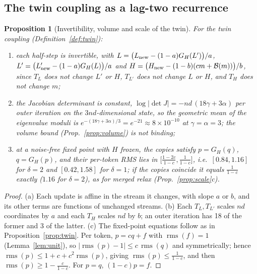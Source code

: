 \documentclass[11pt]{article}
\newtheorem{proposition}{Proposition}
\theoremstyle{definition}
\newcommand{\rms}{\operatorname{rms}}
\newcommand{\Bk}{\mathcal{B}}
\begin{document}
\subsection{The twin coupling as a lag-two recurrence}\label{sec:twintheory}

\begin{proposition}[Invertibility, volume and scale of the twin]\label{prop:twinprops}
For the twin coupling (Definition~\ref{def:twin}):
\begin{enumerate}[label=(\alph*),itemsep=0pt]
\item each half-step is invertible, with $L=\bigl(L_{\rm new}-(1-a)G_H(L')\bigr)/a$, $L'=\bigl(L'_{\rm new}-(1-a)G_H(L)\bigr)/a$ and
$H=\bigl(H_{\rm new}-(1-b)(cm+\Bk(m))\bigr)/b$, since $T_L$ does not change $L'$ or $H$, $T_{L'}$ does not change $L$ or $H$, and $T_H$ does not change $m$;
\item the Jacobian determinant is constant, $\log|\det J|=-nd\,(18\gamma+3\alpha)$ per outer iteration on the $3nd$-dimensional state, so the
geometric mean of the eigenvalue moduli is $e^{-(18\gamma+3\alpha)/3}=e^{-21}\approx8\times10^{-10}$ at $\gamma=\alpha=3$; the volume bound
(Prop.~\ref{prop:volume}) is not binding;
\item at a noise-free fixed point with $H$ frozen, the copies satisfy $p=G_H(q)$, $q=G_H(p)$, and their per-token RMS lies in
$\bigl[\tfrac{1-2c}{1-c},\tfrac1{1-c}\bigr]$, i.e.\ $[0.84,1.16]$ for $\delta=2$ and $[0.42,1.58]$ for $\delta=1$; if the copies coincide it equals
$\tfrac{1}{1-c}$ exactly ($1.16$ for $\delta=2$), as for merged relax (Prop.~\ref{prop:scale}c).
\end{enumerate}
\end{proposition}
\begin{proof}(a) Each update is affine in the stream it changes, with slope $a$ or $b$, and its other terms are functions of unchanged
streams. (b) Each $T_L,T_{L'}$ scales $nd$ coordinates by $a$ and each $T_H$ scales $nd$ by $b$; an outer iteration has 18 of the former and
3 of the latter. (c) The fixed-point equations follow as in Proposition~\ref{prop:twin}. Per token, $p=cq+f$ with $\rms(f)=1$ (Lemma~\ref{lem:unit}), so
$|\rms(p)-1|\le c\,\rms(q)$ and symmetrically; hence $\rms(p)\le1+c+c^2\rms(p)$, giving $\rms(p)\le\frac1{1-c}$, and then
$\rms(p)\ge1-\frac{c}{1-c}$. For $p=q$, $(1-c)p=f$.\end{proof}
\end{document}
